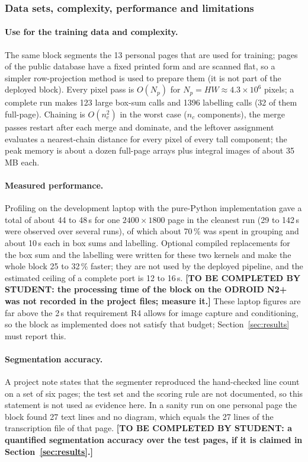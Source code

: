 \subsubsection{Data sets, complexity, performance and limitations}

\paragraph{Use for the training data and complexity.}
The same block segments the 13 personal pages that are used for training; pages of the public database have a fixed printed form and are scanned flat, so a simpler row-projection method is used to prepare them (it is not part of the deployed block).
Every pixel pass is $O(N_p)$ for $N_p=HW\approx4.3\times10^6$ pixels; a complete run makes 123 large box-sum calls and 1396 labelling calls (32 of them full-page).
Chaining is $O(n_c^2)$ in the worst case ($n_c$ components), the merge passes restart after each merge and dominate, and the leftover assignment evaluates a nearest-chain distance for every pixel of every tall component; the peak memory is about a dozen full-page arrays plus integral images of about 35\,MB each.

\paragraph{Measured performance.}
Profiling on the development laptop with the pure-Python implementation gave a total of about 44 to 48\,s for one $2400\times1800$ page in the cleanest run (29 to 142\,s were observed over several runs), of which about 70\,\% was spent in grouping and about 10\,s each in box sums and labelling.
Optional compiled replacements for the box sum and the labelling were written for these two kernels and make the whole block 25 to 32\,\% faster; they are not used by the deployed pipeline, and the estimated ceiling of a complete port is 12 to 16\,s.
\textbf{[TO BE COMPLETED BY STUDENT: the processing time of the block on the ODROID N2+ was not recorded in the project files; measure it.]}
These laptop figures are far above the 2\,s that requirement R4 allows for image capture and conditioning, so the block as implemented does not satisfy that budget; Section~\ref{sec:results} must report this.

\paragraph{Segmentation accuracy.}
A project note states that the segmenter reproduced the hand-checked line count on a set of six pages; the test set and the scoring rule are not documented, so this statement is not used as evidence here.
In a sanity run on one personal page the block found 27 text lines and no diagram, which equals the 27 lines of the transcription file of that page.
\textbf{[TO BE COMPLETED BY STUDENT: a quantified segmentation accuracy over the test pages, if it is claimed in Section~\ref{sec:results}.]}

